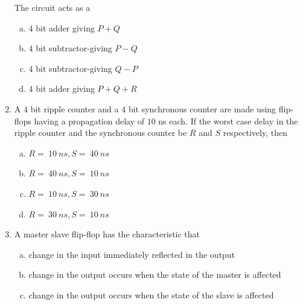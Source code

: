 \documentclass[journal,12pt,twocolumn]{IEEEtran}
\begin{document}
\begin{enumerate}
\begin{figure}
\caption{}

\label{fig:21}

\end{figure} 


The circuit acts as a


\begin{enumerate}[(a)]
 
\item $4$ bit adder giving $ P+Q $

\item $4$ bit subtractor-giving $ P-Q $

\item $4$ bit subtractor-giving $ Q-P $

\item $4$ bit adder giving $ P+Q+R $


\end{enumerate}


\item A $4$ bit ripple counter and a $4$ bit synchronous counter are made using flip-flops having a propagation delay of $10$ ns each. If the worst case delay in the ripple counter and the synchronous counter be $R$ and $S$ respectively, then  

\begin{enumerate}[(a)]
 
\item $ R= \ 10 \ ns,S=\ 40 \ ns $

\item $ R= \ 40 \ ns,S=\ 10 \ ns $

\item $ R= \ 10 \ ns,S=\ 30 \ ns $

\item $ R= \ 30 \ ns,S=\ 10 \ ns $


\end{enumerate}

\item A master slave flip-flop has the characteristic that 

\begin{enumerate}[(a)]
 
\item change in the input immediately reflected in the output

\item change in the output occurs when the state of the master is affected

\item change in the output occurs when the state of the slave is affected


\end{enumerate}
\end{enumerate}
\end{document}

